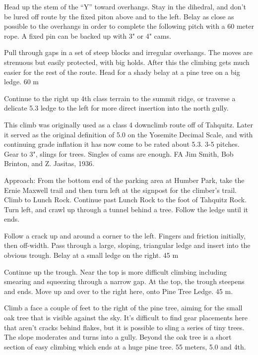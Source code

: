 \documentclass{tahquitz}
\begin{document}
 Head up the stem of the ``Y'' toward overhangs. Stay in the
dihedral, and don't be lured off route by the fixed piton above and
to the left. Belay as close as possible to the overhangs in order to
complete the following pitch with a 60 meter rope. A fixed pin can be
backed up with 3" or 4" cams.

 Pull through gaps in a set of steep blocks and irregular
overhangs. The  moves are strenuous but easily protected, with big
holds. After this the climbing gets much easier for the rest of the
route. Head for a shady belay at a pine tree on a big ledge. 60 m

 Continue to the right up 4th class terrain to the summit ridge,
or traverse a delicate 5.3 ledge to the left for more direct
insertion into the north gully.




This climb was originally used as a class 4 downclimb route off of Tahquitz.
Later it served as the original definition of 5.0 on the Yosemite Decimal
Scale, and with continuing grade inflation it has now come to be
rated about 5.3. 3-5 pitches. Gear to 3",
slings for trees. Singles of cams are enough.
FA Jim Smith, Bob Brinton, and Z. Jasitas, 1936.

Approach: From the bottom end of the parking area at Humber Park,
take the Ernie Maxwell trail and then turn left at the signpost for
the climber's trail. Climb to Lunch Rock. Continue past Lunch Rock to
the foot of Tahquitz Rock. Turn left, and crawl up through a tunnel
behind a tree. Follow the ledge until it ends.

 Follow a crack up and around a corner to the left. Fingers and
friction initially, then off-width. Pass through a large, sloping,
triangular ledge and insert into the obvious trough. Belay at a small
ledge on the right. 45 m

 Continue up the trough. Near the top is more difficult climbing
including smearing and squeezing through a narrow gap. At the top,
the trough steepens and ends. Move up and over to the right here,
onto Pine Tree Ledge. 45 m.

 Climb a face a couple of feet to the right of the pine tree,
aiming for the small oak tree that is visible against the sky. It's
difficult to find gear placements here that aren't cracks behind
flakes, but it is possible to sling a series of tiny trees. The slope
moderates and turns into a gully. Beyond the oak tree is a short
section of easy climbing which ends at a huge pine tree. 55 meters,
5.0 and 4th.
\end{document}

